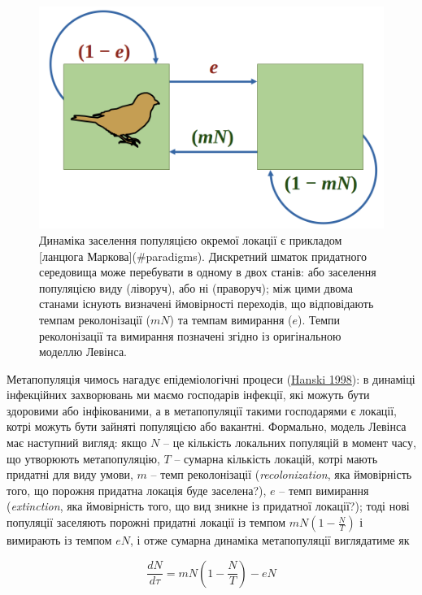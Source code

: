 \documentclass[
  11pt,
]{book}
\begin{document}
\begin{figure}

{\centering \includegraphics[width=13.06in]{images/metapop} 

}

\caption{Динаміка заселення популяцією окремої локації є прикладом [ланцюга Маркова](\#paradigms). Дискретний шматок придатного середовища може перебувати в одному в двох станів: або заселення популяцією виду (ліворуч), або ні (праворуч); між цими двома станами існують визначені ймовірності переходів, що відповідають темпам реколонізації ($mN$) та темпам вимирання ($e$). Темпи реколонізації та вимирання позначені згідно із оригінальною моделлю Левінса.}\label{fig:fig-metapop-mcmc}
\end{figure}

Метапопуляція чимось нагадує епідеміологічні процеси (\href{htpps://doi.org/10.1038/23876}{Hanski 1998}): в динаміці інфекційних захворювань ми маємо господарів інфекції, які можуть бути здоровими або інфікованими, а в метапопуляції такими господарями є локації, котрі можуть бути зайняті популяцією або вакантні. Формально, модель Левінса має наступний вигляд: якщо \(N\) -- це кількість локальних популяцій в момент часу, що утворюють метапопуляцію, \(T\) -- сумарна кількість локацій, котрі мають придатні для виду умови, \(m\) -- темп реколонізації (\emph{recolonization}, яка ймовірність того, що порожня придатна локація буде заселена?), \(e\) -- темп вимирання (\emph{extinction}, яка ймовірність того, що вид зникне із придатної локації?); тоді нові популяції заселяють порожні придатні локації із темпом \(mN(1-\frac{N}{T})\) і вимирають із темпом \(eN\), і отже сумарна динаміка метапопуляції виглядатиме як

\[\frac{dN}{d\tau} = mN(1-\frac{N}{T}) - eN\]
\end{document}
